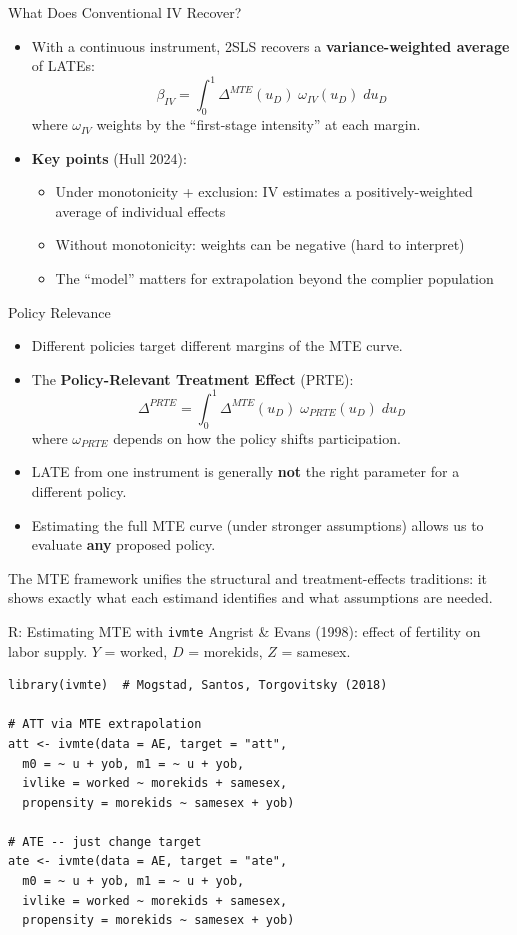\documentclass[aspectratio=169, handout]{beamer}
\numberwithin{equation}{section}
\begin{document}
\begin{frame}{What Does Conventional IV Recover?}
\begin{itemize}
\item With a continuous instrument, 2SLS recovers a \textbf{variance-weighted average} of LATEs:
$$\beta_{IV} = \int_0^1 \Delta^{MTE}(u_D)\;\omega_{IV}(u_D)\;du_D$$
where $\omega_{IV}$ weights by the ``first-stage intensity'' at each margin.
\item \textbf{Key points} (Hull 2024):
\begin{itemize}
\item Under monotonicity + exclusion: IV estimates a positively-weighted average of individual effects
\item Without monotonicity: weights can be negative (hard to interpret)
\item The ``model'' matters for extrapolation beyond the complier population
\end{itemize}
\end{itemize}
\end{frame}


\begin{frame}{Policy Relevance}
\begin{itemize}
\item Different policies target different margins of the MTE curve.
\item The \textbf{Policy-Relevant Treatment Effect} (PRTE):
$$\Delta^{PRTE} = \int_0^1 \Delta^{MTE}(u_D)\;\omega_{PRTE}(u_D)\;du_D$$
where $\omega_{PRTE}$ depends on how the policy shifts participation.
\item LATE from one instrument is generally \textbf{not} the right parameter for a different policy.
\item Estimating the full MTE curve (under stronger assumptions) allows us to evaluate \textbf{any} proposed policy.
\end{itemize}
\begin{tcolorbox}[colback=blue!5, colframe=blue!50]
The MTE framework unifies the structural and treatment-effects traditions: it shows exactly what each estimand identifies and what assumptions are needed.
\end{tcolorbox}
\end{frame}


\begin{frame}[fragile]{R: Estimating MTE with \texttt{ivmte}}
\small Angrist \& Evans (1998): effect of fertility on labor supply.  $Y$ = worked, $D$ = morekids, $Z$ = samesex.
\begin{lstlisting}
library(ivmte)  # Mogstad, Santos, Torgovitsky (2018)

# ATT via MTE extrapolation
att <- ivmte(data = AE, target = "att",
  m0 = ~ u + yob, m1 = ~ u + yob,
  ivlike = worked ~ morekids + samesex,
  propensity = morekids ~ samesex + yob)

# ATE -- just change target
ate <- ivmte(data = AE, target = "ate",
  m0 = ~ u + yob, m1 = ~ u + yob,
  ivlike = worked ~ morekids + samesex,
  propensity = morekids ~ samesex + yob)
\end{lstlisting}
\end{frame}
\end{document}
